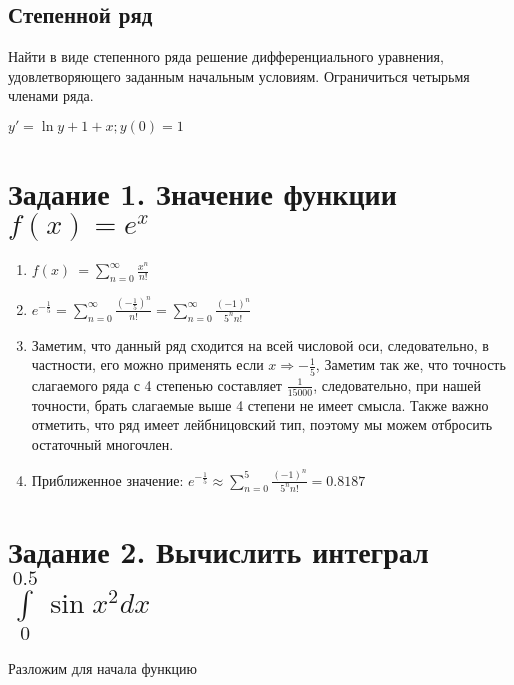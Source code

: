 \documentclass{article}
\renewcommand{\thesubsection}{Задание \arabic{subsection}.}
\begin{document}
\subsection{Степенной ряд}

Найти в виде степенного ряда решение дифференциального уравнения, удовлетворяющего заданным начальным условиям. Ограничиться четырьмя членами ряда. 
\begin{center}
    $y' = \ln{y} + 1 + x; y(0) = 1$
\end{center}

\renewcommand{\thesubsection}{\arabic{subsection}.}


\section{Задание 1. Значение функции $f(x) = e^x$}

\begin{enumerate}
    \item $f\left(x\right)\ =\sum\limits_{n=0}^{\infty}\frac{x^n}{n!}$
    \item $e^{-\frac{1}{5}} = \sum\limits_{n=0}^{\infty}\frac{(-\frac{1}{5})^n}{n!} = \sum\limits_{n=0}^{\infty}\frac{(-1)^n}{5^nn!}$
    \item Заметим, что данный ряд сходится на всей числовой оси, следовательно, в частности, его можно применять если $x \Rightarrow -\frac{1}{5}$, Заметим так же, что точность слагаемого ряда с 4 степенью составляет $\frac{1}{15000}$, следовательно, при нашей точности, брать слагаемые выше 4 степени не имеет смысла. Также важно отметить, что ряд имеет лейбницовский тип, поэтому мы можем отбросить остаточный многочлен.
    \item Приближенное значение: $e^{-\frac{1}{5}} \approx  \sum\limits_{n=0}^{5}\frac{(-1)^n}{5^nn!} = 0.8187$
\end{enumerate}




\section{Задание 2. Вычислить интеграл $\int\limits_{0}^{0.5} \sin{x^2}dx$}

Разложим для начала функцию
\end{document}
